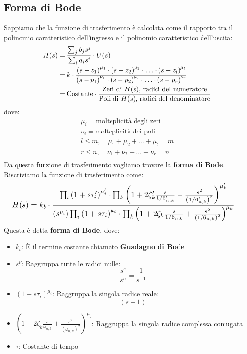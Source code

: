 \documentclass[a4paper]{article}
\begin{document}
\subsection{Forma di Bode}
Sappiamo che la funzione di trasferimento è calcolata come il rapporto tra
il polinomio caratteristico dell'ingresso e il polinomio caratteristico dell'uscita:
\[
  \begin{aligned}
    H(s) &= \frac{\sum_j b_j s^j}{\sum_i a_i s^i} \cdot U(s)\\
         &= k \cdot \frac{
           \left( s - z_1 \right)^{\mu_1} \cdot \left( s - z_2 \right)^{\mu_2} \cdot \ldots \cdot \left( s - z_l \right)^{\mu_l}
         }{
           \left( s - p_1 \right)^{\nu_1} \cdot \left( s - p_2 \right)^{\nu_2} \cdot \ldots \cdot \left( s - p_r \right)^{\nu_r}
         }\\
         &= \text{Costante} \cdot \frac{
           \text{Zeri di \( H(s) \), radici del numeratore}
         }{
           \text{Poli di \( H(s) \), radici del denominatore}
         }
  \end{aligned}
\] 
dove:
\[
\begin{aligned}
  \mu_i = \text{molteplicità degli zeri}\\
  \nu_i = \text{molteplicità dei poli}\\
  l \le m, \quad \mu_1 + \mu_2 + \ldots + \mu_l = m\\
  r \le n, \quad \nu_1 + \nu_2 + \ldots + \nu_r = n\\
\end{aligned}
\] 
Da questa funzione di trasferimento vogliamo trovare la \textbf{forma di Bode}.
Riscriviamo la funzione di trasferimento come:
\[
  \resizebox{1\hsize}{!}{
    $
\begin{aligned}
  H(s) &= k_b \cdot \frac{
    \prod_i \left( 1 + s \tau'_i \right)^{\mu'_i} \cdot \prod_k \left( 1 + 2 \zeta'_k
    \frac{s}{\omega'_{n,k}} + \frac{s^2}{\left( \omega'_{n,k} \right) ^2} \right)^{\mu'_k}
  }{
    \left( s^{\nu_i} \right) \prod_i \left( 1 + s \tau_i \right)^{\mu_i} \cdot
    \prod_k \left( 1 + 2 \zeta_k \frac{s}{\omega_{n,k}} + \frac{s^2}{\left( \omega_{n,k} \right)^2} \right)^{\mu_k}
  }
\end{aligned}
$
}
\] 
Questa è detta \textbf{forma di Bode}, dove:
\begin{itemize}
  \item \( k_b \): È il termine costante chiamato \textbf{Guadagno di Bode}
  \item \( s^{\nu} \): Raggruppa tutte le radici nulle:
    \[
      \frac{s^s}{s^n} = \frac{1}{s^{-1}}
    \] 
  \item \( \left( 1 + s\tau_i \right)^{\mu_i} \): Raggruppa la singola radice reale:
    \[
    \left( s + 1 \right) 
    \] 
  \item \( \left( 1 + 2 \zeta_k \frac{s}{\omega_{n,k}} + \frac{s^2}{\left( \omega_{n,k} \right)^2} \right)^{\mu_k} \):
    Raggruppa la singola radice complessa coniugata
  \item \( \tau \): Costante di tempo
\end{itemize}
\end{document}
